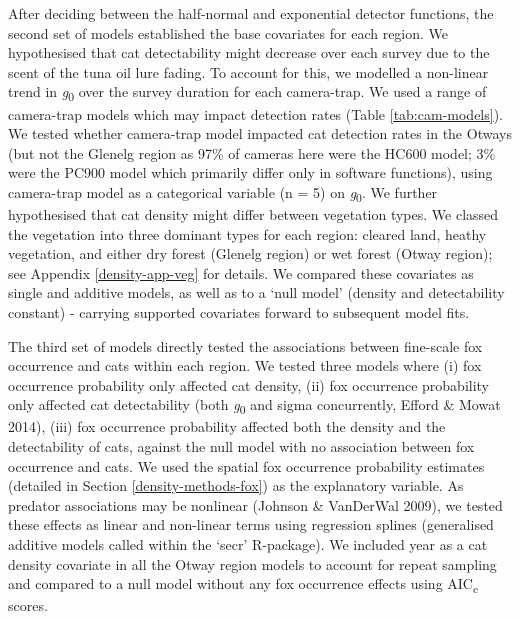 \documentclass[11pt,a4paper,titlepage,twoside,openright]{style/unimelbthesis}
\begin{document}
\begin{mainmatter}
After deciding between the half-normal and exponential detector functions, the second set of models established the base covariates for each region. We hypothesised that cat detectability might decrease over each survey due to the scent of the tuna oil lure fading. To account for this, we modelled a non-linear trend in \emph{g}\textsubscript{0} over the survey duration for each camera-trap. We used a range of camera-trap models which may impact detection rates (Table \ref{tab:cam-models}). We tested whether camera-trap model impacted cat detection rates in the Otways (but not the Glenelg region as 97\% of cameras here were the HC600 model; 3\% were the PC900 model which primarily differ only in software functions), using camera-trap model as a categorical variable (n = 5) on \emph{g}\textsubscript{0}. We further hypothesised that cat density might differ between vegetation types. We classed the vegetation into three dominant types for each region: cleared land, heathy vegetation, and either dry forest (Glenelg region) or wet forest (Otway region); see Appendix \ref{density-app-veg} for details. We compared these covariates as single and additive models, as well as to a `null model' (density and detectability constant) - carrying supported covariates forward to subsequent model fits.

The third set of models directly tested the associations between fine-scale fox occurrence and cats within each region. We tested three models where (i) fox occurrence probability only affected cat density, (ii) fox occurrence probability only affected cat detectability (both \emph{g}\textsubscript{0} and sigma concurrently, Efford \& Mowat 2014), (iii) fox occurrence probability affected both the density and the detectability of cats, against the null model with no association between fox occurrence and cats. We used the spatial fox occurrence probability estimates (detailed in Section \ref{density-methods-fox}) as the explanatory variable. As predator associations may be nonlinear (Johnson \& VanDerWal 2009), we tested these effects as linear and non-linear terms using regression splines (generalised additive models called within the `secr' R-package). We included year as a cat density covariate in all the Otway region models to account for repeat sampling and compared to a null model without any fox occurrence effects using AIC\textsubscript{c} scores.


\end{mainmatter}
\end{document}

